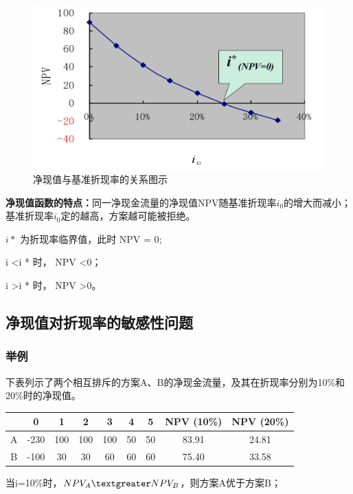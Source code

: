 \begin{figure}[H]
    \centering
    \includegraphics[width=\textwidth]{image/净现值与基准折现率的关系图示.png}
    \caption{净现值与基准折现率的关系图示}
    \label{fig:15}
\end{figure}

\textbf{净现值函数的特点：}同一净现金流量的净现值NPV随基准折现率$i_0$的增大而减小；基准折现率$i_0$定的越高，方案越可能被拒绝。

$i*$ 为折现率临界值，此时 NPV = 0;

i \textless i * 时， NPV \textless 0；

i \textgreater i * 时， NPV \textgreater 0。

\subsection{净现值对折现率的敏感性问题}
\subsubsection{举例}
下表列示了两个相互排斥的方案A、B的净现金流量，及其在折现率分别为10\%和20\%时的净现值。

\begin{table}[H]
\centering
\begin{tabular}{|c|c|c|c|c|c|c|c|c|}
\hline
    & 0   & 1   & 2   & 3   & 4   & 5   & NPV (10\%) & NPV (20\%) \\ \hline
A   & -230 & 100 & 100 & 100 & 50  & 50  & 83.91      & 24.81      \\ \hline
B   & -100 & 30  & 30  & 60  & 60  & 60  & 75.40      & 33.58      \\ \hline
\end{tabular}
\end{table}

当i=10\%时，$NPV_A \textgreater NPV_B$，则方案A优于方案B；

